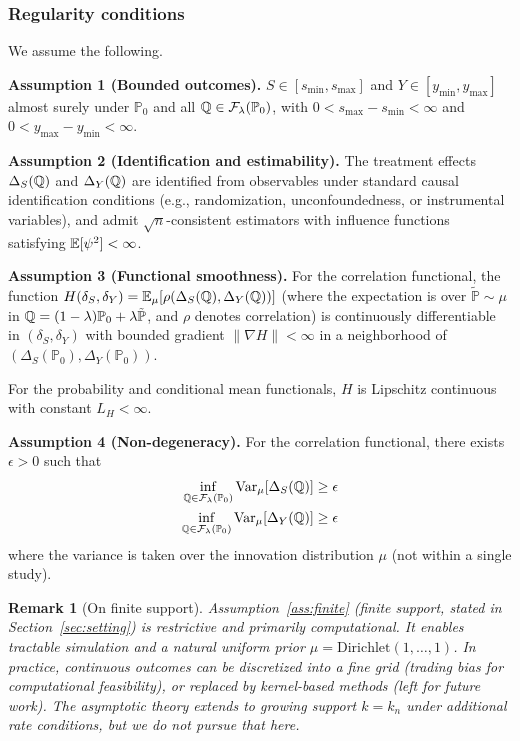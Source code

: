 \documentclass{article}
\newtheorem{remark}{Remark}
\newcommand{\PP}{\mathbb{P}}
\begin{document}
\subsubsection{Regularity conditions}
We assume the following.

\noindent\textbf{Assumption 1 (Bounded outcomes).}\label{ass:bounded}
$S \in [s_{\min}, s_{\max}]$ and $Y \in [y_{\min}, y_{\max}]$ almost surely
under $\PP_0$ and all $\Q \in \cF_\lambda(\PP_0)$, with
$0 < s_{\max} - s_{\min} < \infty$ and $0 < y_{\max} - y_{\min} < \infty$.

\noindent\textbf{Assumption 2 (Identification and estimability).}\label{ass:identification}
The treatment effects $\Delta_S(\mathbb{Q})$ and $\Delta_Y(\mathbb{Q})$ are identified from
observables under standard causal identification conditions (e.g., randomization,
unconfoundedness, or instrumental variables), and admit $\sqrt{n}$-consistent
estimators with influence functions satisfying $\mathbb{E}[\psi^2] < \infty$.

\noindent\textbf{Assumption 3 (Functional smoothness).}\label{ass:smoothness}
For the correlation functional, the function
$H(\delta_S, \delta_Y) = \mathbb{E}_\mu[\rho(\Delta_S(\mathbb{Q}), \Delta_Y(\mathbb{Q}))]$
(where the expectation is over $\tilde{\PP} \sim \mu$ in
$\Q = (1-\lambda)\PP_0 + \lambda\tilde{\PP}$, and $\rho$ denotes correlation)
is continuously differentiable in $(\delta_S, \delta_Y)$ with bounded gradient
$\|\nabla H\| < \infty$ in a neighborhood of $(\Delta_S(\PP_0), \Delta_Y(\PP_0))$.

For the probability and conditional mean functionals, $H$ is Lipschitz continuous
with constant $L_H < \infty$.

\noindent\textbf{Assumption 4 (Non-degeneracy).}\label{ass:nondegeneracy}
For the correlation functional, there exists $\epsilon > 0$ such that
\begin{align*}
    \inf_{\Q \in \cF_\lambda(\PP_0)} \Var_\mu[\Delta_S(\Q)] &\geq \epsilon\\
    \inf_{\Q \in \cF_\lambda(\PP_0)} \Var_\mu[\Delta_Y(\Q)] &\geq \epsilon
\end{align*}
where the variance is taken over the innovation distribution $\mu$
(not within a single study).

\begin{remark}[On finite support]
Assumption~\ref{ass:finite} (finite support, stated in Section~\ref{sec:setting}) is restrictive
and primarily computational. It enables tractable simulation and a natural uniform
prior $\mu = \text{Dirichlet}(1,\ldots,1)$. In practice, continuous outcomes can be
discretized into a fine grid (trading bias for computational feasibility), or
replaced by kernel-based methods (left for future work). The asymptotic theory
extends to growing support $k=k_n$ under additional rate conditions, but we do not
pursue that here.
\end{remark}
\end{document}
